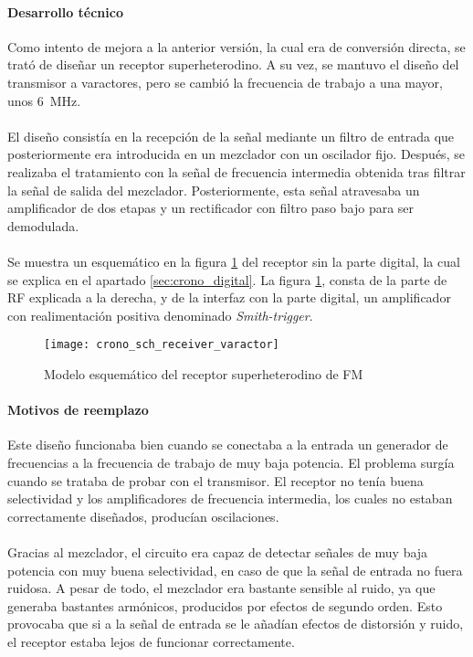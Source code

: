 \paragraph{Desarrollo técnico}
Como intento de mejora a la anterior versión, la cual era de conversión directa, se trató de diseñar un receptor superheterodino. A su vez, se mantuvo el diseño del transmisor a varactores, pero se cambió la frecuencia de trabajo a una mayor, unos \SI{6}{\mega\hertz}. 
\paragraph{}
El diseño consistía en la recepci\'on de la señal mediante un filtro de entrada que posteriormente era introducida en un mezclador con un oscilador fijo. Después, se realizaba el tratamiento con la señal de frecuencia intermedia obtenida tras filtrar la señal de salida del mezclador. Posteriormente, esta señal atravesaba un amplificador de dos etapas y un rectificador con filtro paso bajo para ser demodulada. 
\paragraph{}
Se muestra un esquemático en la figura \ref{fig:crono_sch_receiver_varactor} del receptor sin la parte digital, la cual se explica en el apartado \ref{sec:crono_digital}. La figura \ref{fig:crono_sch_receiver_varactor}, consta de la parte de RF explicada a la derecha, y de la interfaz con la parte digital, un amplificador con realimentaci\'on positiva denominado \textit{Smith-trigger}.

\begin{figure}[h!]
    \centering
    \texttt{[image: crono\_sch\_receiver\_varactor]}
    \caption{Modelo esquem\'atico del receptor superheterodino de FM}
    \label{fig:crono_sch_receiver_varactor}
\end{figure}

\paragraph{Motivos de reemplazo}
Este diseño funcionaba bien cuando se conectaba a la entrada un generador de frecuencias a la frecuencia de trabajo de muy baja potencia.
El problema surgía cuando se trataba de probar con el transmisor. 
El receptor no tenía buena selectividad y los amplificadores de frecuencia intermedia, los cuales no estaban correctamente diseñados, producían oscilaciones.
\paragraph{}
Gracias al mezclador, el circuito era capaz de detectar señales de muy baja potencia con muy buena selectividad, en caso de que la señal de entrada no fuera ruidosa. A pesar de todo, el mezclador era bastante sensible al ruido, ya que generaba bastantes armónicos, producidos por efectos de segundo orden. Esto provocaba que si a la señal de entrada se le añadían efectos de distorsión y ruido, el receptor estaba lejos de funcionar correctamente. 
